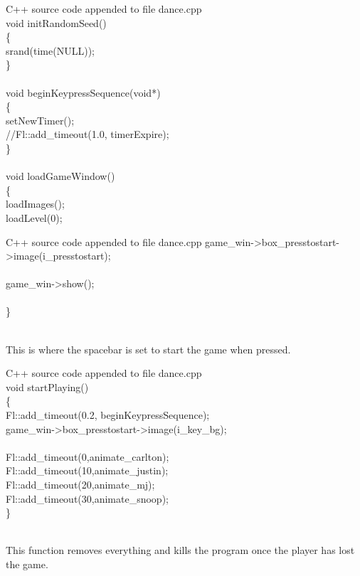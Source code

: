 \documentclass {article}
\begin{document}
\begin{GFT}{C++ source code appended to file dance.cpp}
\+\\
\+void initRandomSeed()\\
\+\{\\
\+	srand(time(NULL));\\
\+\}\\
\+\\
\+void beginKeypressSequence(void*)\\
\+\{\\
\+	setNewTimer();\\
\+	//Fl::add\_timeout(1.0, timerExpire);\\
\+\}\\
\+\\
\+void loadGameWindow()\\
\+\{\\
\+	loadImages();\\
\+	loadLevel(0);\\
\end{GFT}
\clearpage
\begin{GFT}{C++ source code appended to file dance.cpp}
\+	game\_win->box\_presstostart->image(i\_presstostart);\\
\+\\
\+	game\_win->show();\\
\+\\
\+\}\\
\+\\
\end{GFT}
\clearpage
This is where the spacebar is set to start the game when pressed.

\begin{GFT}{C++ source code appended to file dance.cpp}
\+\\
\+void startPlaying()\\
\+\{\\
\+	Fl::add\_timeout(0.2, beginKeypressSequence);\\
\+	game\_win->box\_presstostart->image(i\_key\_bg);\\
\+\\
\+	Fl::add\_timeout(0,animate\_carlton);\\
\+	Fl::add\_timeout(10,animate\_justin);\\
\+	Fl::add\_timeout(20,animate\_mj);\\
\+	Fl::add\_timeout(30,animate\_snoop);	\\
\+\}\\
\+\\
\end{GFT}
\clearpage
This function removes everything and kills the program once the player has lost the game.
\end{document}
